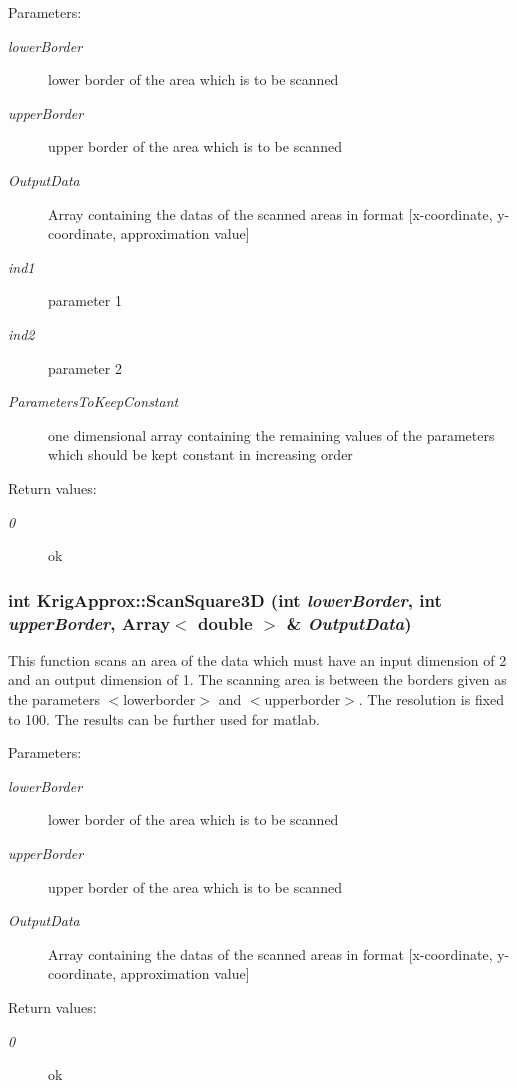 \begin{Desc}
\item[Parameters:]
\begin{description}
\item[{\em lower\-Border}]lower border of the area which is to be scanned \item[{\em upper\-Border}]upper border of the area which is to be scanned \item[{\em Output\-Data}]Array containing the datas of the scanned areas in format [x-coordinate, y-coordinate, approximation value] \item[{\em ind1}]parameter 1 \item[{\em ind2}]parameter 2 \item[{\em Parameters\-To\-Keep\-Constant}]one dimensional array containing the remaining values of the parameters which should be kept constant in increasing order \end{description}
\end{Desc}
\begin{Desc}
\item[Return values:]
\begin{description}
\item[{\em 0}]ok \end{description}
\end{Desc}
\subsubsection{\setlength{\rightskip}{0pt plus 5cm}int Krig\-Approx::Scan\-Square3D (int {\em lower\-Border}, int {\em upper\-Border}, Array$<$ double $>$ \& {\em Output\-Data})}\label{classKrigApprox_a12}


This function scans an area of the data which must have an input dimension of 2 and an output dimension of 1. The scanning area is between the borders given as the parameters $<$lowerborder$>$ and $<$upperborder$>$. The resolution is fixed to 100. The results can be further used for matlab. 

\begin{Desc}
\item[Parameters:]
\begin{description}
\item[{\em lower\-Border}]lower border of the area which is to be scanned \item[{\em upper\-Border}]upper border of the area which is to be scanned \item[{\em Output\-Data}]Array containing the datas of the scanned areas in format [x-coordinate, y-coordinate, approximation value] \end{description}
\end{Desc}
\begin{Desc}
\item[Return values:]
\begin{description}
\item[{\em 0}]ok \end{description}
\end{Desc}
